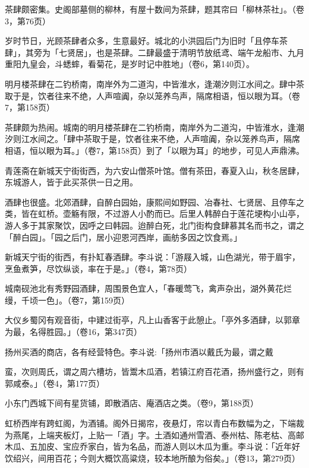 茶肆颇密集。史阁部墓侧的柳林，有屋十数间为茶肆，题其帘曰「柳林茶社」。（卷3，第76页）


岁时节日，光顾茶肆者众多，生意最好。城北的小洪园后门为旧时「且停车茶肆」，其旁为「七贤居」，也是茶肆。二肆最盛于清明节放纸鸢、端午龙船市、九月重阳九皇会，斗蟋蟀，看菊花，是岁时记中胜地」（卷6，第140页）。

明月楼茶肆在二钓桥南，南岸外为二道沟，中皆淮水，逢潮汐则江水间之。肆中茶取于是，饮者往来不绝，人声喧阗，杂以笼养鸟声，隔席相语，恒以眼为耳。（卷7，第158页）

茶肆颇为热闹。城南的明月楼茶肆在二钓桥南，南岸外为二道沟，中皆淮水，逢潮汐则江水间之。「肆中茶取于是，饮者往来不绝，人声喧阗，杂以笼养鸟声，隔席相语，恒以眼为耳。」（卷7，第158页）到了「以眼为耳」的地步，可见人声鼎沸。

青莲斋在新城天宁街街西，为六安山僧茶叶馆。僧有茶田，春夏入山，秋冬居肆，东城游人，皆于此买茶供一日之用。


酒肆也很盛。北郊酒肆，自醉白园始，康熙间如野园、冶春社、七贤居、且停车之类，皆在虹桥。壶觞有限，不过游人小酌而已。后里人韩醉白于莲花埂构小山亭，游人多于其家聚饮，因呼之曰韩园。迨醉白死，北门街构食肆慕其名而书之，谓之「醉白园」。「园之后门，居小迎恩河西岸，画舫多因之饮食焉。」

新城天宁街的街西，有扑缸春酒肆。李斗说：「游屐入城，山色湖光，带于眉宇，烹鱼煮笋，尽饮纵谈，率在于是。」（卷4，第78页）

城南砚池北有秀野园酒肆，周围景色宜人，「春暖莺飞，禽声杂出，湖外黄花烂缦，千顷一色」。（卷7，第159页）

大仪乡蜀冈有观音街，中建过街亭，凡上山香客于此憩止。「亭外多酒肆，以郭章为最，名得胜园。」（卷16，第347页）

扬州买酒的商店，各有经营特色。李斗说:「扬州市酒以戴氏为最，谓之戴


\noindent 蛮，次则周氏，谓之周六槽坊，皆鬻木瓜酒，若镇江府百花酒，扬州盛行之，则有郭咸泰。」（卷4，第177页）

小东门西城下间有星货铺，即散酒店、庵酒店之类。（卷9，第188页）

虹桥西岸有跨虹阁，为酒铺。阁外日揭帘，夜悬灯，帘以青白布数幅为之，下端裁为燕尾，上端夹板灯，上贴一「酒」字。土酒如通州雪酒、泰州枯、陈老枯、高邮木瓜、五加皮、宝应乔家白，皆为名品，而游人则以木瓜为重。李斗说：「近年好饮绍兴，间用百花；今则大概饮高粱烧，较本地所酿为俗矣。」（卷13，第279页）

